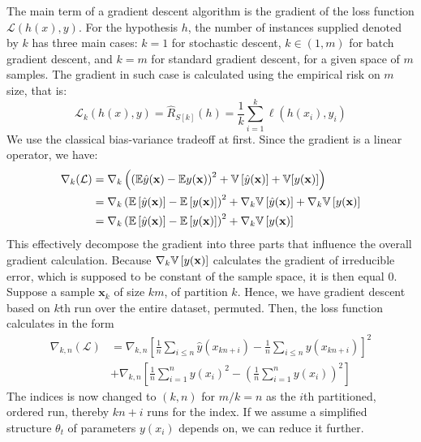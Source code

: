 The main term of a gradient descent algorithm is the gradient of the loss function $\mathcal{L}(h(x),y)$. For the hypothesis $h$, the number of instances supplied denoted by $k$ has three main cases: $k=1$ for stochastic descent, $k\in (1,m)$ for batch gradient descent, and $k=m$ for standard gradient descent, for a given space of $m$ samples. The gradient in such case is calculated using the empirical risk on $m$ size, that is: 
\begin{equation}
    \mathcal{L}_{k}(h(x),y) = \hat{R}_{S[k]}(h) = \frac{1}{k} \sum^{k}_{i=1} \ell(h(x_{i}),y_{i})
\end{equation}
We use the classical bias-variance tradeoff at first. Since the gradient is a linear operator, we have: 
\begin{equation}
    \begin{split}
        \nabla_{k}(\mathcal{L}) &= \nabla_{k}\left(\left({\mathbb{E}\hat{y}(\mathbf{x}) - \mathbb{E} y(\mathbf{x})}\right)^2 + \mathbb{V}\left[{\hat{y}(\mathbf{x})}\right] + \mathbb{V}[{y(\mathbf{x})}]\right)\\
        & = \nabla_{k}\left( \mathbb{E}\left[\hat{y}(\mathbf{x})\right] - \mathbb{E}\left[y(\mathbf{x})\right] \right)^2 + \nabla_{k}\mathbb{V}\left[\hat{y}(\mathbf{x})\right] + \nabla_{k}\mathbb{V}\left[y(\mathbf{x})\right] \\
        & = \nabla_{k}\left( \mathbb{E}\left[\hat{y}(\mathbf{x})\right] - \mathbb{E}\left[y(\mathbf{x})\right] \right)^2 + \nabla_{k}\mathbb{V}\left[y(\mathbf{x})\right]
    \end{split}
\end{equation}
This effectively decompose the gradient into three parts that influence the overall gradient calculation. Because $\nabla_{k}\mathbb{V}\left[y(\mathbf{x})\right]$ calculates the gradient of irreducible error, which is supposed to be constant of the sample space, it is then equal $0$. Suppose a sample $\mathbf{x}_{k}$ of size $km$, of partition $k$. Hence, we have gradient descent based on $k$th run over the entire dataset, permuted. Then, the loss function calculates in the form 
\begin{equation}
  \begin{split}
    \nabla_{k,n}(\mathcal{L}) &= \nabla_{k,n}\left[ \frac{1}{n}\sum_{i\leq n} \hat{y}(x_{kn+i})  - \frac{1}{n}\sum_{i\leq n} y(x_{kn+i}) \right]^{2} \\
    &+ \nabla_{k,n} \left[ \frac{1}{n}\sum_{i=1}^n y(x_i)^2 - \left( \frac{1}{n}\sum_{i=1}^n y(x_i) \right)^2 \right]
  \end{split}
\end{equation}
The indices is now changed to $(k,n)$ for $m/k=n$ as the $i$th partitioned, ordered run, thereby $kn+i$ runs for the index. If we assume a simplified structure $\theta_{t}$ of parameters $y(x_{i})$ depends on, we can reduce it further.  
